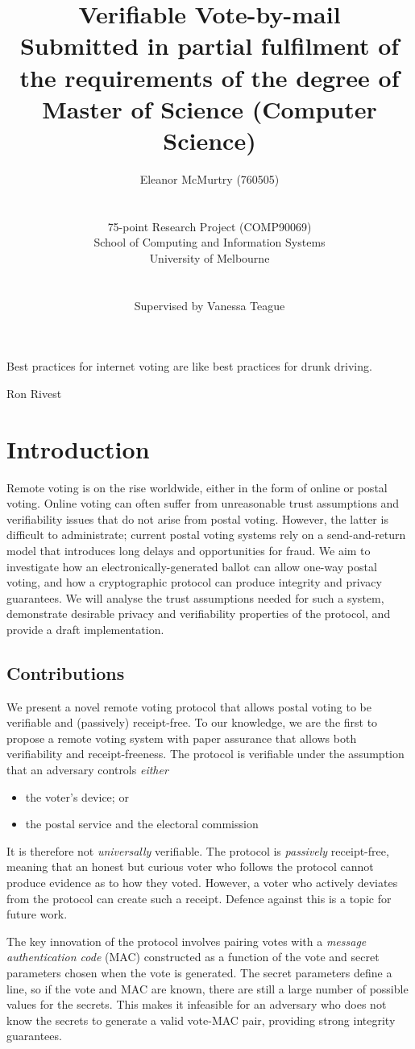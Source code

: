 \documentclass[12pt,a4paper]{article}
\title{Verifiable Vote-by-mail\\\large Submitted in partial fulfilment of the requirements of the degree of\\Master of Science (Computer Science)}
\author{Eleanor McMurtry (760505)\\\\\\75-point Research Project (COMP90069)\\School of Computing and Information Systems\\University of Melbourne\\\\\\Supervised by Vanessa Teague}
\theoremstyle{definition}
\newcounter{protocol}
\begin{document}
\maketitle
\newpage
\tableofcontents
\newpage
\epigraph{Best practices for internet voting are like best practices for drunk driving.}{Ron Rivest}
\section{Introduction}
Remote voting is on the rise worldwide, either in the form of online or postal voting. Online voting can often suffer from unreasonable trust assumptions and verifiability issues that do not arise from postal voting. However, the latter is difficult to administrate; current postal voting systems rely on a send-and-return model that introduces long delays and opportunities for fraud. We aim to investigate how an electronically-generated ballot can allow one-way postal voting, and how a cryptographic protocol can produce integrity and privacy guarantees. We will analyse the trust assumptions needed for such a system, demonstrate desirable privacy and verifiability properties of the protocol, and provide a draft implementation.

\subsection{Contributions}
We present a novel remote voting protocol that allows postal voting to be verifiable and (passively) receipt-free. To our knowledge, we are the first to propose a remote voting system with paper assurance that allows both verifiability and receipt-freeness. The protocol is verifiable under the assumption that an adversary controls \textit{either}
\begin{itemize}
    \item the voter's device; or
    \item the postal service and the electoral commission
\end{itemize}
It is therefore not \textit{universally} verifiable. The protocol is \textit{passively} receipt-free, meaning that an honest but curious voter who follows the protocol cannot produce evidence as to how they voted. However, a voter who actively deviates from the protocol can create such a receipt. Defence against this is a topic for future work.

The key innovation of the protocol involves pairing votes with a \textit{message authentication code} (MAC) constructed as a function of the vote and secret parameters chosen when the vote is generated. The secret parameters define a line, so if the vote and MAC are known, there are still a large number of possible values for the secrets. This makes it infeasible for an adversary who does not know the secrets to generate a valid vote-MAC pair, providing strong integrity guarantees.
\end{document}
